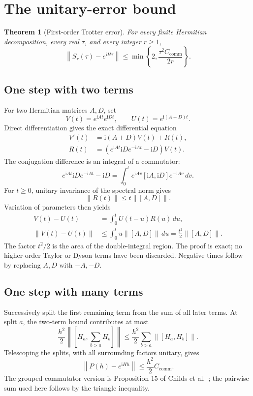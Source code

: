 \documentclass[11pt,a4paper]{article}
\newcommand{\norm}[1]{\left\lVert #1\right\rVert}
\newcommand{\ii}{\mathrm{i}}
\newcommand{\CC}{C_{\mathrm{comm}}}
\newtheorem{theorem}{Theorem}
\begin{document}
\section{The unitary-error bound}
\begin{theorem}[First-order Trotter error]\label{thm:unitary}
For every finite Hermitian decomposition, every real $\tau$, and every integer $r\geq1$,
\begin{equation}\label{eq:unitary}
 \boxed{\norm{S_r(\tau)-e^{\ii H\tau}}
 \leq\min\left\{2,\frac{\tau^2\CC}{2r}\right\}.}
\end{equation}
\end{theorem}

\subsection{One step with two terms}
For two Hermitian matrices $A,D$, set
\begin{equation}
 V(t)=e^{\ii At}e^{\ii Dt},\qquad U(t)=e^{\ii(A+D)t}.
\end{equation}
Direct differentiation gives the exact differential equation
\begin{align}
 V'(t)&=\ii(A+D)V(t)+R(t),\\
 R(t)&=\left(e^{\ii At}\ii D e^{-\ii At}-\ii D\right)V(t).
\end{align}
The conjugation difference is an integral of a commutator:
\begin{equation}
 e^{\ii At}\ii D e^{-\ii At}-\ii D
 =\int_0^t e^{\ii Av}[\ii A,\ii D]e^{-\ii Av}\,dv.
\end{equation}
For $t\geq0$, unitary invariance of the spectral norm gives
\begin{equation}
 \norm{R(t)}\leq t\norm{[A,D]}.
\end{equation}
Variation of parameters then yields
\begin{align}
 V(t)-U(t)&=\int_0^t U(t-u)R(u)\,du,\\
 \norm{V(t)-U(t)}&\leq\int_0^t u\norm{[A,D]}\,du
 =\frac{t^2}{2}\norm{[A,D]}.
\end{align}
The factor $t^2/2$ is the area of the double-integral region. The proof is exact; no higher-order Taylor or Dyson terms have been discarded. Negative times follow by replacing $A,D$ with $-A,-D$.

\subsection{One step with many terms}
Successively split the first remaining term from the sum of all later terms. At split $a$, the two-term bound contributes at most
\begin{equation}
 \frac{h^2}{2}\norm{\left[H_a,\sum_{b>a}H_b\right]}
 \leq\frac{h^2}{2}\sum_{b>a}\norm{[H_a,H_b]}.
\end{equation}
Telescoping the splits, with all surrounding factors unitary, gives
\begin{equation}\label{eq:local}
 \norm{P(h)-e^{\ii Hh}}\leq\frac{h^2}{2}\CC.
\end{equation}
The grouped-commutator version is Proposition 15 of Childs et al.~\cite{childs}; the pairwise sum used here follows by the triangle inequality.
\end{document}

